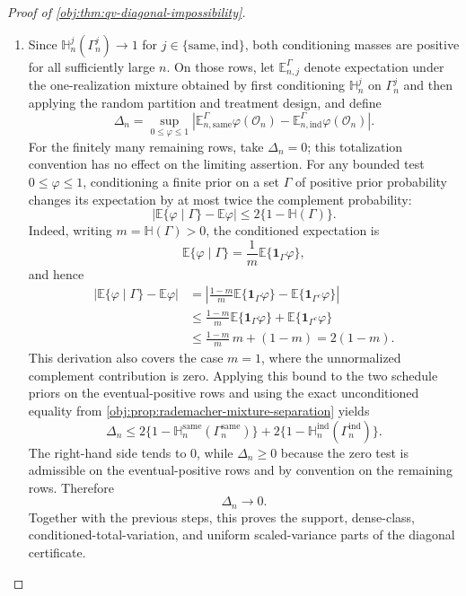 \begin{proof}[Proof of \cref{obj:thm:qv-diagonal-impossibility}]
\begin{enumerate}
\item Since \(\mathbb H_n^j(\Gamma_n^j)\to1\) for \(j\in\{\mathrm{same},\mathrm{ind}\}\), both conditioning masses are positive for all sufficiently large \(n\). On those rows, let \(\mathbb E_{n,j}^{\Gamma}\) denote expectation under the one-realization mixture obtained by first conditioning \(\mathbb H_n^j\) on \(\Gamma_n^j\) and then applying the random partition and treatment design, and define
\[
\Delta_n=
\sup_{0\le \varphi\le1}
\left|
\mathbb E_{n,\mathrm{same}}^{\Gamma}\varphi(\mathcal O_n)
-
\mathbb E_{n,\mathrm{ind}}^{\Gamma}\varphi(\mathcal O_n)
\right|.
\]
For the finitely many remaining rows, take \(\Delta_n=0\); this totalization convention has no effect on the limiting assertion. For any bounded test \(0\le\varphi\le1\), conditioning a finite prior on a set \(\Gamma\) of positive prior probability changes its expectation by at most twice the complement probability:
\[
\left|
\mathbb E\{\varphi\mid \Gamma\}-\mathbb E\varphi
\right|
\le
2\{1-\mathbb H(\Gamma)\}.
\]
Indeed, writing \(m=\mathbb H(\Gamma)>0\), the conditioned expectation is
\[
\mathbb E\{\varphi\mid\Gamma\}=\frac{1}{m}\mathbb E\{\mathbf 1_\Gamma\varphi\},
\]
and hence
\[
\begin{aligned}
\left|
\mathbb E\{\varphi\mid \Gamma\}-\mathbb E\varphi
\right|
&=
\left|
\frac{1-m}{m}\mathbb E\{\mathbf 1_\Gamma\varphi\}
-
\mathbb E\{\mathbf 1_{\Gamma^c}\varphi\}
\right| \\
&\le
\frac{1-m}{m}\mathbb E\{\mathbf 1_\Gamma\varphi\}
+
\mathbb E\{\mathbf 1_{\Gamma^c}\varphi\} \\
&\le
\frac{1-m}{m}\,m+(1-m)
=2(1-m).
\end{aligned}
\]
This derivation also covers the case \(m=1\), where the unnormalized complement contribution is zero. Applying this bound to the two schedule priors on the eventual-positive rows and using the exact unconditioned equality from \cref{obj:prop:rademacher-mixture-separation} yields
\[
\Delta_n
\le
2\{1-\mathbb H_n^{\mathrm{same}}(\Gamma_n^{\mathrm{same}})\}
+
2\{1-\mathbb H_n^{\mathrm{ind}}(\Gamma_n^{\mathrm{ind}})\}.
\]
The right-hand side tends to \(0\), while \(\Delta_n\ge0\) because the zero test is admissible on the eventual-positive rows and by convention on the remaining rows. Therefore
\[
\Delta_n\to0.
\]
Together with the previous steps, this proves the support, dense-class, conditioned-total-variation, and uniform scaled-variance parts of the diagonal certificate. %


\end{enumerate}
\end{proof}
